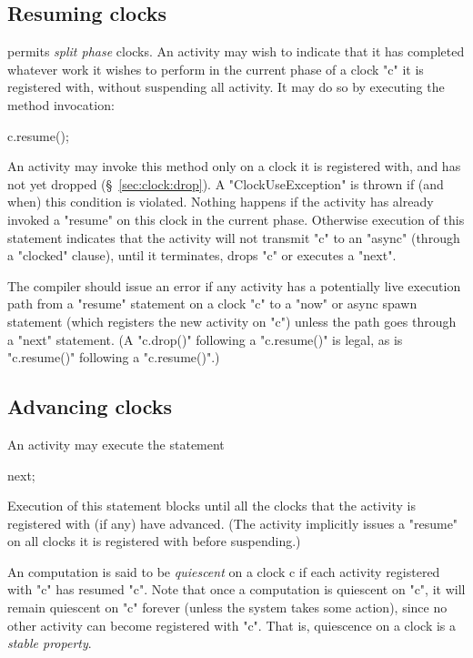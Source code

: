 \subsection{Resuming clocks}\label{resume}\label{sec:clock:resume}
\Xten{} permits {\em split phase} clocks. An activity may wish
to indicate that it has completed whatever work it wishes to perform
in the current phase of a  clock \xcd"c" it is registered with, without
suspending all activity. It may do so  by executing the method
invocation:
\begin{xten}
c.resume();
\end{xten}

An activity may invoke this method only on a clock it is registered
with, and has not yet dropped (\S~\ref{sec:clock:drop}). A \xcd"ClockUseException" is thrown if (and
when) this condition is violated.  Nothing happens if the activity has
already invoked a \xcd"resume" on this clock in the current phase.
Otherwise execution of this statement indicates that the activity will
not transmit \xcd"c" to an \xcd"async" (through a \xcd"clocked"
clause),
until it terminates, drops \xcd"c" or executes a \xcd"next". 

\begin{staticrule*}
The compiler should issue an error if any activity has a potentially
live execution path from a \xcd"resume" statement on a clock \xcd"c"
to a \xcd"now" or async spawn statement (which registers the new
activity on \xcd"c") unless the path goes through a \xcd"next"
statement. (A \xcd"c.drop()" following a \xcd"c.resume()" is legal,
as is \xcd"c.resume()" following a \xcd"c.resume()".)
\end{staticrule*}

\subsection{Advancing clocks}\label{sec:clock:next}
An activity may execute the statement
\begin{xten}
next;
\end{xten}

\noindent 
Execution of this statement blocks until all the clocks that the
activity is registered with (if any) have advanced. (The activity
implicitly issues a \xcd"resume" on all clocks it is registered
with before suspending.)

An \Xten{} computation is said to be {\em quiescent} on a clock {\cf
c} if each activity registered with \xcd"c" has resumed \xcd"c".
Note that once a computation is quiescent on \xcd"c", it will remain
quiescent on \xcd"c" forever (unless the system takes some action),
since no other activity can become registered with \xcd"c".  That is,
quiescence on a clock is a {\em stable property}.

